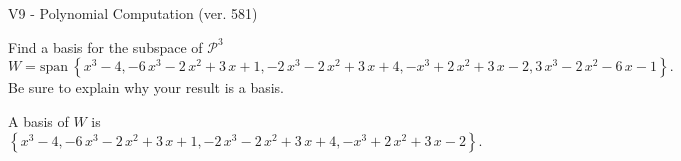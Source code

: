 \begin{exercise}
  \begin{exerciseTitle}V9 - Polynomial Computation (ver. 581)\end{exerciseTitle}
  \begin{exerciseStatement}
    Find a basis for the subspace of \(\mathcal{P}^3\) 
\[W=\mathrm{span}\ \left\{x^{3} - 4 , -6 \, x^{3} - 2 \, x^{2} + 3 \, x + 1 , -2 \, x^{3} - 2 \, x^{2} + 3 \, x + 4 , -x^{3} + 2 \, x^{2} + 3 \, x - 2 , 3 \, x^{3} - 2 \, x^{2} - 6 \, x - 1\right\}.\]
 Be sure to explain why your result is a basis.


  \end{exerciseStatement}
  \begin{exerciseAnswer}
   A basis of \(W\) is  \(\left\{x^{3} - 4 , -6 \, x^{3} - 2 \, x^{2} + 3 \, x + 1 , -2 \, x^{3} - 2 \, x^{2} + 3 \, x + 4 , -x^{3} + 2 \, x^{2} + 3 \, x - 2\right\}\).
  


  \end{exerciseAnswer}
\end{exercise}